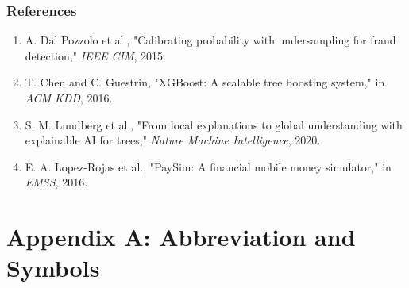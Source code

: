 \documentclass[12pt,a4paper,oneside]{report}
\begin{document}
\subsection{References}
\begin{enumerate}[leftmargin=0.35in]
\item A. Dal Pozzolo et al., "Calibrating probability with undersampling for fraud detection," \textit{IEEE CIM}, 2015.
\item T. Chen and C. Guestrin, "XGBoost: A scalable tree boosting system," in \textit{ACM KDD}, 2016.
\item S. M. Lundberg et al., "From local explanations to global understanding with explainable AI for trees," \textit{Nature Machine Intelligence}, 2020.
\item E. A. Lopez-Rojas et al., "PaySim: A financial mobile money simulator," in \textit{EMSS}, 2016.
\end{enumerate}

\newpage


\chapter*{Appendix A: Abbreviation and Symbols}
\end{document}
